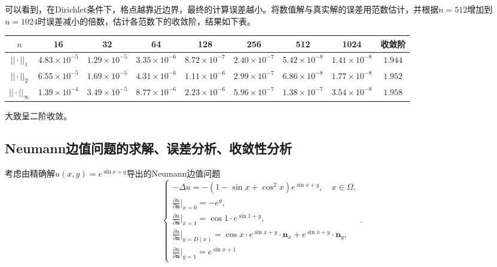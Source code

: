 \documentclass[lang=cn,10pt]{elegantbook}
\begin{document}
可以看到，在Dirichlet条件下，格点越靠近边界，最终的计算误差越小。将数值解与真实解的误差用范数估计，并根据$n=512$增加到$n=1024$时误差减小的倍数，估计各范数下的收敛阶，结果如下表。

\begin{table}[H]
  \centering
  \small
  \begin{tabular}{c|ccccccc|c}
  \textbf{$n$}        & 16                   & 32                   & 64                   & 128                  & 256                  & 512                  & 1024                  & 收敛阶 \\ \hline
  $||\cdot||_1$      & $4.83\times 10^{-5}$ & $1.29\times 10^{-5}$ & $3.35\times 10^{-6}$ & $8.72\times 10^{-7}$ & $2.40\times 10^{-7}$ & $5.42\times 10^{-8}$ & $1.41\times 10^{-8}$ & $1.944$\\
  $||\cdot||_2$      & $6.55\times 10^{-5}$ & $1.69\times 10^{-5}$ & $4.31\times 10^{-6}$ & $1.11\times 10^{-6}$ & $2.99\times 10^{-7}$ & $6.86\times 10^{-8}$ & $1.77\times 10^{-8}$ & $1.952$\\
  $||\cdot||_\infty$ & $1.39\times 10^{-4}$ & $3.49\times 10^{-5}$ & $8.77\times 10^{-6}$ & $2.23\times 10^{-6}$ & $5.96\times 10^{-7}$ & $1.38\times 10^{-7}$ & $3.54\times 10^{-8}$ & $1.958$
  \end{tabular}
\end{table}

大致呈二阶收敛。

\subsection{Neumann边值问题的求解、误差分析、收敛性分析}

考虑由精确解$u(x,y)=e^{\sin x+y}$导出的Neumann边值问题
\begin{equation}
  \left\{
    \begin{array}{l}
      -\Delta u = -(1-\sin x+\cos^2 x)e^{\sin x + y},\quad x\in\Omega, \\
      \frac{\partial u}{\partial \mathbf{n}}|_{x=0}=-e^{y},\\
      \frac{\partial u}{\partial \mathbf{n}}|_{x=1}=\cos 1 \cdot e^{\sin 1 + y},\\
      \frac{\partial u}{\partial \mathbf{n}}|_{y=D(x)}=\cos x\cdot e^{\sin x + y} \cdot \mathbf{n}_x + e^{\sin x + y} \cdot \mathbf{n}_y,\\
      \frac{\partial u}{\partial \mathbf{n}}|_{y=1}=e^{\sin x+1}
    \end{array}
  \right. .
\end{equation}
\end{document}
